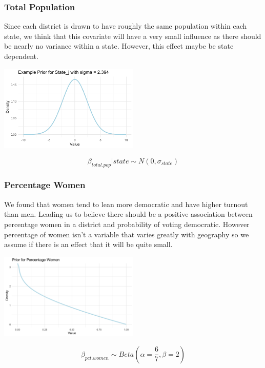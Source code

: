 \documentclass{beamer}
\begin{document}
\begin{frame}
  \frametitle{Total Population}
  Since each district is drawn to have roughly the same population within each state, we think that this covariate will have a very small influence as there should be nearly no variance within a state. However, this effect maybe be state dependent. 
  \begin{center}
    \includegraphics[width=0.5\textwidth]{plots/prior_total_pop.png}
  \end{center}
  
  $$ \beta_{total.pop} | state \sim  N(0, \sigma_{state})$$
\end{frame}

\begin{frame}
  \frametitle{Percentage Women}
  We found that women tend to lean more democratic and have higher turnout than men. Leading us to believe there should be a positive association between percentage women in a district and probability of voting democratic. 
  However percentage of women isn't a variable that varies greatly with geography so we assume if there is an effect that it will be quite small.  
  \begin{center}
    \includegraphics[width=0.5\textwidth]{plots/prior_pct.women.png}
  \end{center}
  
  $$ \beta_{pct.women} \sim Beta(\alpha = \frac{6}{7}, \beta = 2) $$
\end{frame}
\end{document}
